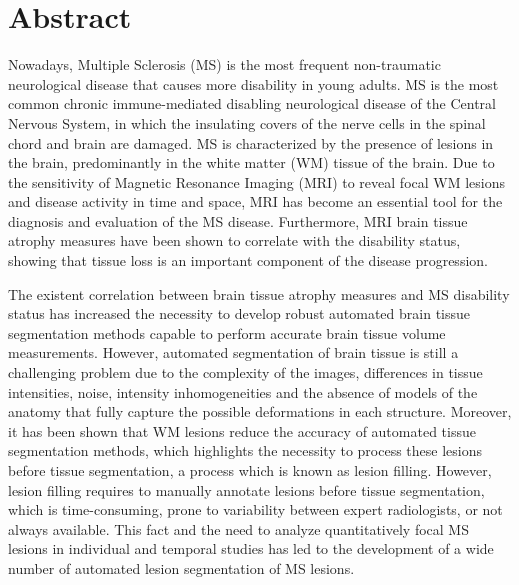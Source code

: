 \chapter*{Abstract}


Nowadays, Multiple Sclerosis (MS) is the most frequent non-traumatic neurological disease that causes more disability in young adults. MS is the most common chronic immune-mediated disabling neurological disease of the Central Nervous System, in which the insulating covers of the nerve cells in the spinal chord and brain are damaged. MS is characterized by the presence of lesions in the brain, predominantly in the white matter (WM) tissue of the brain. Due to the sensitivity of Magnetic Resonance Imaging (MRI) to reveal focal WM lesions and disease activity in time and space, MRI has become an essential tool for the diagnosis and evaluation of the MS disease. Furthermore, MRI brain tissue atrophy measures have been shown to correlate with the disability status, showing that tissue loss is an important component of the disease progression. 

The existent correlation between brain tissue atrophy measures and MS disability status has increased the necessity to develop robust automated brain tissue segmentation methods capable to perform accurate brain tissue volume measurements. However, automated segmentation of brain tissue is still a challenging problem due to the complexity of the images, differences in tissue intensities, noise, intensity inhomogeneities and the absence of models of the anatomy that fully capture the possible deformations in each structure. Moreover, it has been shown that WM lesions reduce the accuracy of automated tissue segmentation methods, which highlights the necessity to process these lesions before tissue segmentation, a process which is known as lesion filling. However, lesion filling requires to manually annotate lesions before tissue segmentation, which is time-consuming, prone to variability between expert radiologists, or not always available. This fact and the need to analyze quantitatively focal MS lesions in individual and temporal studies has led to the development of a wide number of automated lesion segmentation of MS lesions. 

